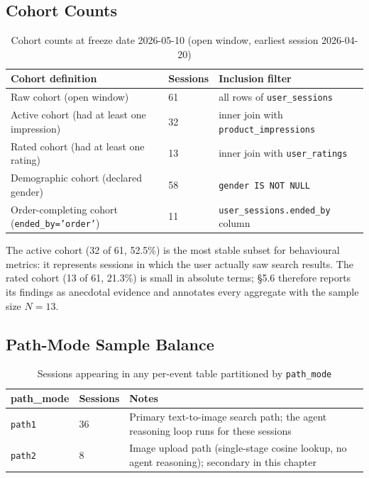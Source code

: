 \subsection{Cohort Counts}
\label{subsec:cohort_counts}

\begin{table}[H]
\centering
\begin{tabular}{p{6.5cm}p{2.0cm}p{4.5cm}}
\toprule
\textbf{Cohort definition} & \textbf{Sessions} & \textbf{Inclusion filter}\\
\midrule
Raw cohort (open window) & 61 & all rows of \texttt{user\_sessions}\\
Active cohort (had at least one impression) & 32 & inner join with \texttt{product\_impressions}\\
Rated cohort (had at least one rating) & 13 & inner join with \texttt{user\_ratings}\\
Demographic cohort (declared gender) & 58 & \texttt{gender IS NOT NULL}\\
Order-completing cohort (\texttt{ended\_by='order'}) & 11 & \texttt{user\_sessions.ended\_by} column\\
\bottomrule
\end{tabular}
\caption{Cohort counts at freeze date 2026-05-10 (open window, earliest session 2026-04-20)}
\label{tab:cohort_counts}
\end{table}

The active cohort (32 of 61, 52.5\%) is the most stable subset for behavioural metrics: it represents sessions in which the user actually saw search results. The rated cohort (13 of 61, 21.3\%) is small in absolute terms; §5.6 therefore reports its findings as anecdotal evidence and annotates every aggregate with the sample size $N=13$.

\subsection{Path-Mode Sample Balance}
\label{subsec:path_balance}

\begin{table}[H]
\centering
\begin{tabular}{p{3cm}p{3cm}p{6cm}}
\toprule
\textbf{path\_mode} & \textbf{Sessions} & \textbf{Notes}\\
\midrule
\texttt{path1} & 36 & Primary text-to-image search path; the agent reasoning loop runs for these sessions\\
\texttt{path2} & 8  & Image upload path (single-stage cosine lookup, no agent reasoning); secondary in this chapter\\
\bottomrule
\end{tabular}
\caption{Sessions appearing in any per-event table partitioned by \texttt{path\_mode}}
\label{tab:path_balance}
\end{table}

